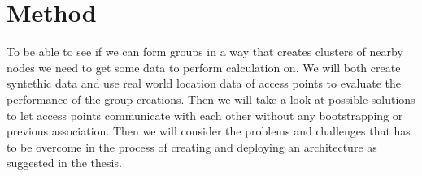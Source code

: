 \section{Method}
To be able to see if we can form groups in a way that creates clusters of nearby nodes we need to get some data to perform
calculation on. We will both create syntethic data and use real world location data of access points to evaluate the performance of the group creations. 
Then we will take a look at possible solutions to let access points communicate with each other without any bootstrapping or 
previous association. Then we will consider the problems and challenges that has to be overcome in the process of creating and deploying 
an architecture as suggested in the thesis. 





